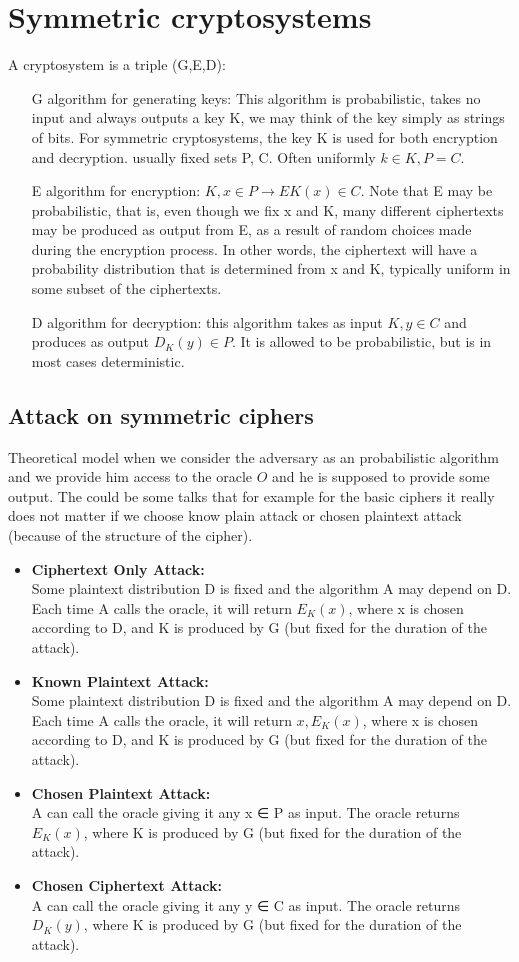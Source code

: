 \documentclass[a4paper,10pt]{article}
\begin{document}
\section*{Symmetric cryptosystems}
A cryptosystem is a triple (G,E,D):
\begin{itemize}
\item[G] algorithm for generating keys: This algorithm is probabilistic, takes no input and always outputs a key K, we may think of the key simply as strings of bits. For symmetric cryptosystems, the key K is used for both encryption and decryption. usually fixed sets P, C. Often uniformly $k \in K, P=C$.
\item[E] algorithm for encryption: $K, x \in P \rightarrow EK(x) \in C$. Note that E may be probabilistic, that is, even though we fix x and K, many different ciphertexts may be produced as output from E, as a result of random choices made during the encryption process. In other words, the ciphertext will have a probability distribution that is
determined from x and K, typically uniform in some subset of the ciphertexts. 
\item[D] algorithm for decryption: this algorithm takes as input $K,y \in C$ and produces as output
$D_K(y) \in P$. It is allowed to be probabilistic, but is in most cases deterministic.
\end{itemize}
\subsection*{Attack on symmetric ciphers}
Theoretical model when we consider the adversary as an probabilistic algorithm and we provide him access to the oracle $O$ and he is supposed to provide some output. The could be some talks that for example for the basic ciphers it really does not matter if we choose know plain attack or chosen plaintext attack (because of the structure of the cipher). 
\begin{itemize}
\item
\textbf{Ciphertext Only Attack:}\\ Some plaintext distribution D is fixed and the algorithm A may depend on D. Each time A calls the oracle, it will return $E_K(x)$, where x is chosen according to D, and K is produced by G (but fixed for the duration of the attack).
\item 
\textbf{Known Plaintext Attack:}\\ Some plaintext distribution D is fixed and the algorithm A may depend on D. Each time A calls the oracle, it will return $x,E_K(x)$, where x is chosen according to D, and K is produced by G (but fixed for the duration of the attack).
\item 
\textbf{Chosen Plaintext Attack:}\\ A can call the oracle giving it any x ∈ P as input. The oracle returns $E_K(x)$, where K is produced by G (but fixed for the duration of the attack).
\item 
\textbf{Chosen Ciphertext Attack: }\\ A can call the oracle giving it any y ∈ C as input. The oracle returns $D_K(y)$, where K is produced by G (but fixed for the duration of the attack).
\end{itemize}
\end{document}
